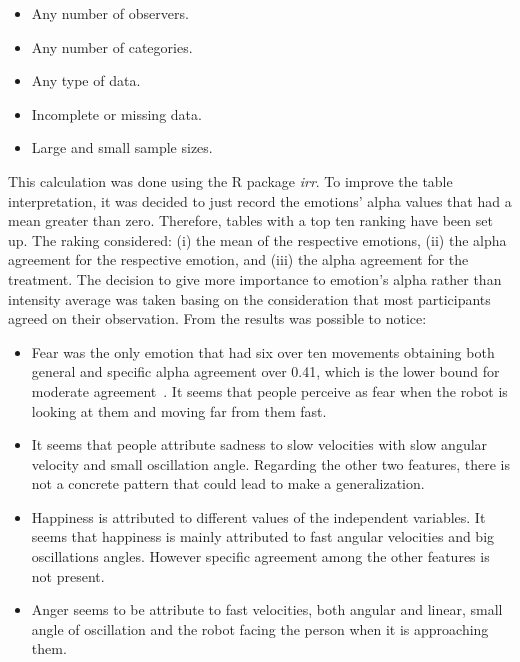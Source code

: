 \begin{itemize}
	
	\item Any number of observers.

	\item Any number of categories.

	\item Any type of data.

	\item Incomplete or missing data.

	\item Large and small sample sizes.
\end{itemize}

This calculation was done using the R package \textit{irr}. To improve the table interpretation, it was decided to just record the emotions' alpha values that had a mean greater than zero. Therefore, tables with a top ten ranking have been set up. The raking considered: (i) the mean of the respective emotions, (ii) the alpha agreement for the respective emotion, and (iii) the alpha agreement for the treatment. The decision to give more importance to emotion's alpha rather than intensity average was taken basing on the consideration that most participants agreed on their observation. From the results was possible to notice:

\begin{itemize}

	\item Fear was the only emotion that had six over ten movements obtaining both general and specific alpha agreement over 0.41, which is the lower bound for moderate agreement~\cite{Viera2005}. It seems that people perceive as fear when the robot is looking at them and moving far from them fast. 
	
	\item It seems that people attribute sadness to slow velocities with slow angular velocity and small oscillation angle. Regarding the other two features, there is not a concrete pattern that could lead to make a generalization. 

	\item Happiness is attributed to different values of the independent variables. It seems that happiness is mainly attributed to fast angular velocities and big oscillations angles. However specific agreement among the other features is not present.

	\item Anger seems to be attribute to fast velocities, both angular and linear, small angle of oscillation and the robot facing the person when it is approaching them. 
	
\end{itemize} 
